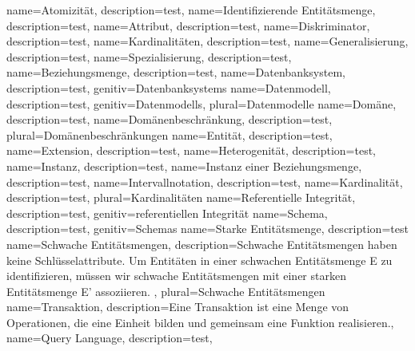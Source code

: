 {
    name={Atomizität},
    description={test}, 
}
{
    name={Identifizierende Entitätsmenge},
    description={test}, 
}
{
    name={Attribut},
    description={test}, 
}
{
    name={Diskriminator},
    description={test}, 
}
{
    name={Kardinalitäten},
    description={test}, 
}
{
    name={Generalisierung},
    description={test}, 
}
{
    name={Spezialisierung},
    description={test}, 
}
{
    name={Beziehungsmenge},
    description={test}, 
}
{
    name={Datenbanksystem},
    description={test}, 
    genitiv={Datenbanksystems}
}
{
    name={Datenmodell},
    description={test}, 
    genitiv={Datenmodells}, 
    plural={Datenmodelle}
}
{
    name={Domäne},
    description={test}, 
}
{
    name={Domänenbeschränkung},
    description={test}, 
    plural={Domänenbeschränkungen}
}
{
    name={Entität},
    description={test}, 
}
{
    name={Extension},
    description={test}, 
}
{
    name={Heterogenität},
    description={test}, 
}
{
    name={Instanz},
    description={test}, 
}
{
    name={Instanz einer Beziehungsmenge},
    description={test}, 
}
{
    name={Intervallnotation},
    description={test}, 
}
{
    name={Kardinalität},
    description={test}, 
    plural={Kardinalitäten}
}
{
    name={Referentielle Integrität},
    description={test}, 
    genitiv={referentiellen Integrität}
}
{
    name={Schema},
    description={test}, 
    genitiv={Schemas}
}
{
    name={Starke Entitätsmenge},
    description={test}
}
{
    name={Schwache Entitätsmengen},
    description={Schwache Entitätsmengen haben keine Schlüsselattribute. Um Entitäten in einer schwachen Entitätsmenge E zu identifizieren, müssen wir schwache Entitätsmengen mit einer starken Entitätsmenge E’ assoziieren. },
    plural={Schwache Entitätsmengen}
}
{
    name={Transaktion},
    description={Eine Transaktion ist eine Menge von Operationen, die eine Einheit bilden und gemeinsam eine Funktion realisieren.},
}
{
    name={Query Language},
    description={test},
}




